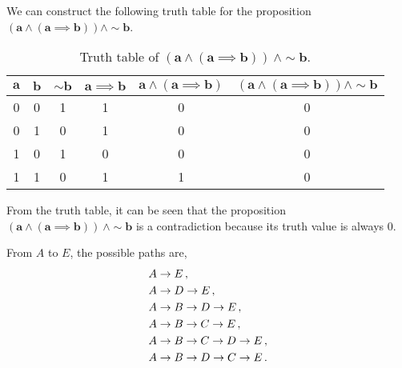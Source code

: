 \begin{subquestions}
\begin{subsubquestions}
\end{subsubquestions}


\subquestion

We can construct the following truth table for the proposition $\boldsymbol{(a \land (a \implies b)) \land \sim b}$.
\begin{table}[ht]
	\centering
	\begin{tabular}{|c|c|c|c|c|c|}
		\hline
		$\boldsymbol{a}$ & $\boldsymbol{b}$ & $\boldsymbol{\sim b}$ & $\boldsymbol{a \implies b}$ & $\boldsymbol{a \land (a \implies b)}$ & $\boldsymbol{(a \land (a \implies b)) \land \sim b}$ \\
		\hline
		0 & 0 & 1 & 1 & 0 & 0 \\
		0 & 1 & 0 & 1 & 0 & 0 \\
		1 & 0 & 1 & 0 & 0 & 0 \\
		1 & 1 & 0 & 1 & 1 & 0 \\
		\hline
	\end{tabular}
	\caption{\label{2009:q2:tab:TruthTab1} Truth table of $\boldsymbol{(a \land (a \implies b)) ~\land \sim b}$.}
\end{table}

From the truth table, it can be seen that the proposition $\boldsymbol{(a \land (a \implies b)) ~\land \sim b}$ is a contradiction because its truth value is always 0.


\subquestion

From $A$ to $E$, the possible paths are,
\begin{align}
	& A \rightarrow E\,, \nonumber \\
	& A \rightarrow D \rightarrow E\,, \nonumber \\
	& A \rightarrow B \rightarrow D \rightarrow E\,, \nonumber \\
	& A \rightarrow B \rightarrow C \rightarrow E\,, \nonumber \\
	& A \rightarrow B \rightarrow C \rightarrow D \rightarrow E\,, \nonumber \\
	& A \rightarrow B \rightarrow D \rightarrow C \rightarrow E\,. 	
\end{align}


\end{subquestions}
